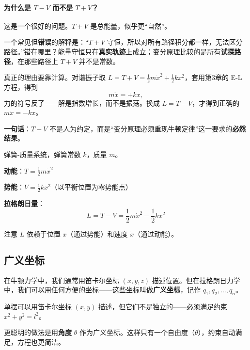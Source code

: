 \paragraph{为什么是 $T - V$ 而不是 $T + V$？}

这是一个很好的问题。$T + V$ 是总能量，似乎更“自然”。

一个常见但\textbf{错误}的解释是：“$T+V$ 守恒，所以对所有路径积分都一样，无法区分路径。”错在哪里？能量守恒只在\textbf{真实轨迹}上成立；变分原理比较的是所有\textbf{试探路径}，在那些路径上 $T+V$ 并不是常数。

真正的理由要靠计算。对谐振子取 $L = T + V = \frac{1}{2}m\dot{x}^2 + \frac{1}{2}kx^2$，套用第3章的 E-L 方程，得到
\[
m\ddot{x} = +kx,
\]
力的符号反了——解是指数增长，而不是振荡。换成 $L = T - V$，才得到正确的 $m\ddot{x} = -kx$。

\textbf{一句话}：$T - V$ 不是人为约定，而是“变分原理必须重现牛顿定律”这一要求的\textbf{必然结果}。

\begin{example}[一维谐振子的拉格朗日量]
弹簧-质量系统，弹簧常数 $k$，质量 $m$。

\textbf{动能}：$T = \frac{1}{2}m\dot{x}^2$

\textbf{势能}：$V = \frac{1}{2}kx^2$（以平衡位置为零势能点）

\textbf{拉格朗日量}：
\[
L = T - V = \frac{1}{2}m\dot{x}^2 - \frac{1}{2}kx^2
\]

注意 $L$ 依赖于位置 $x$（通过势能）和速度 $\dot{x}$（通过动能）。
\end{example}

\subsection{广义坐标}

在牛顿力学中，我们通常用笛卡尔坐标 $(x, y, z)$ 描述位置。但在拉格朗日力学中，我们可以用任何方便的坐标——这些坐标叫做\textbf{广义坐标}，记作 $q_1, q_2, \ldots, q_n$。

\begin{example}[单摆的广义坐标]
单摆可以用笛卡尔坐标 $(x, y)$ 描述，但它们不是独立的——必须满足约束 $x^2 + y^2 = l^2$。

更聪明的做法是用\textbf{角度} $\theta$ 作为广义坐标。这样只有一个自由度（$\theta$），约束自动满足，方程也更简洁。
\end{example}

